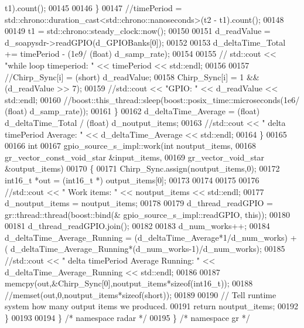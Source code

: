 \begin{DoxyCode}
      t1).count();
00145 
00146         \}
00147         \textcolor{comment}{//timePeriod = std::chrono::duration\_cast<std::chrono::nanoseconds>(t2 - t1).count();}
00148 
00149         t1 = std::chrono::steady\_clock::now();
00150 
00151         d_readValue = d_soapysdr->readGPIO(d_GPIOBanks[0]);
00152 
00153         d_deltaTime_Total += timePeriod - (1e9/ (float) d\_samp\_rate);
00154 
00155       \textcolor{comment}{//  std::cout << "while loop timeperiod: " << timePeriod  << std::endl;}
00156 
00157         \textcolor{comment}{//Chirp\_Sync[i] = (short) d\_readValue;}
00158         Chirp_Sync[i] = 1 && (d_readValue >> 7);
00159         \textcolor{comment}{//std::cout << "GPIO: " << d\_readValue << std::endl;}
00160         \textcolor{comment}{//boost::this\_thread::sleep(boost::posix\_time::microseconds(1e6/ (float) d\_samp\_rate));}
00161       \}
00162       d_deltaTime_Average = (float) d_deltaTime_Total / (\textcolor{keywordtype}{float}) d_noutput_items;
00163       \textcolor{comment}{//std::cout << "   delta timePeriod Average: " << d\_deltaTime\_Average << std::endl;}
00164     \}
00165 
00166     \textcolor{keywordtype}{int}
00167     gpio_source_s_impl::work(\textcolor{keywordtype}{int} noutput\_items,
00168         gr\_vector\_const\_void\_star &input\_items,
00169         gr\_vector\_void\_star &output\_items)
00170     \{
00171       Chirp_Sync.assign(noutput\_items,0);
00172       int16\_t *out = (int16\_t *) output\_items[0];
00173 
00174 
00175 
00176       \textcolor{comment}{//std::cout << "   Work items: " << noutput\_items << std::endl;}
00177       d_noutput_items = noutput\_items;
00178 
00179       d_thread_readGPIO = gr::thread::thread(boost::bind(&
      gpio_source_s_impl::readGPIO, \textcolor{keyword}{this}));
00180 
00181       d_thread_readGPIO.join();
00182 
00183       d_num_works++;
00184       d_deltaTime_Average_Running = (d_deltaTime_Average*1/d_num_works)  + (
      d_deltaTime_Average_Running*(d_num_works-1)/d_num_works);
00185       \textcolor{comment}{//std::cout << "   delta timePeriod Average Running: " << d\_deltaTime\_Average\_Running << std::endl;}
00186 
00187       memcpy(out,&Chirp_Sync[0],noutput\_items*\textcolor{keyword}{sizeof}(int16\_t));
00188       \textcolor{comment}{//memset(out,0,noutput\_items*sizeof(short));}
00189 
00190       \textcolor{comment}{// Tell runtime system how many output items we produced.}
00191       \textcolor{keywordflow}{return} noutput\_items;
00192     \}
00193 
00194   \} \textcolor{comment}{/* namespace radar */}
00195 \} \textcolor{comment}{/* namespace gr */}
\end{DoxyCode}
